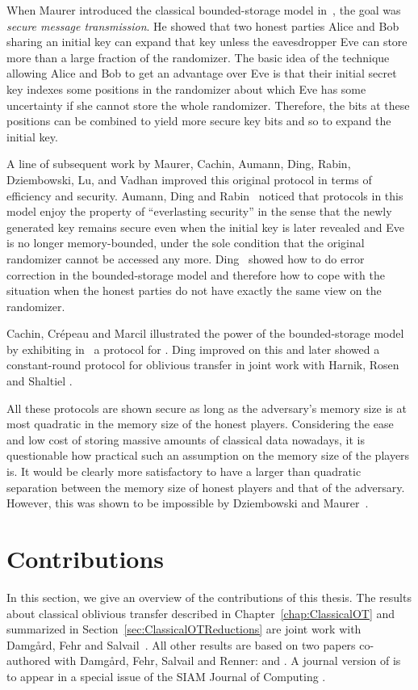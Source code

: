When Maurer introduced the classical bounded-storage model
in~\cite{Maurer90}, the goal was \emph{secure message transmission}.
He showed that two honest parties Alice and Bob sharing an initial key
can expand that key unless the eavesdropper Eve
can store more than a large fraction of the randomizer.  The basic
idea of the technique allowing Alice and Bob to get an advantage
over Eve is that their initial secret key indexes some positions in
the randomizer about which Eve has some uncertainty if she cannot
store the whole randomizer. Therefore, the bits at these positions can
be combined to yield more secure key bits and so to expand the initial
key.

A line of subsequent work by Maurer, Cachin, Aumann, Ding, Rabin,
Dziembowski, Lu, and Vadhan \cite{Maurer92, CM97, ADR02, DM04, Lu04,
  Vadhan04} improved this original protocol in terms of efficiency and
security. Aumann, Ding and Rabin~\cite{ADR02} noticed that
protocols in this model enjoy the property of ``everlasting security'' in the sense that the newly
generated key remains secure even when the initial key is later
revealed and Eve is no longer memory-bounded, under the sole condition
that the original randomizer cannot be accessed any
more. Ding~\cite{Ding05} showed how to do 
error correction in the
bounded-storage model and therefore how to cope with the situation
when the honest parties do not have exactly the same view on the
randomizer.

Cachin, Cr\'epeau and Marcil illustrated the power of the
bounded-storage model by exhibiting in~\cite{CCM98} a protocol for
\OT. Ding improved on this \cite{Ding01} and later showed a
constant-round protocol for oblivious transfer in joint work with
Harnik, Rosen and Shaltiel \cite{DHRS04}.

All these protocols are shown secure as long as the adversary's memory
size is at most quadratic in the memory size of the honest players.
Considering the ease and low cost of storing massive amounts of classical
data nowadays, it is questionable how practical such an assumption on the
memory size of the players is. It would be clearly more satisfactory
to have a larger than quadratic separation between the memory size of
honest players and that of the adversary. However, this was shown to
be impossible by Dziembowski and Maurer~\cite{DM04}.


\section{Contributions} \label{sec:contributions}
In this section, we give an overview of the contributions of this
thesis.
The results about classical oblivious transfer described in
Chapter~\ref{chap:ClassicalOT} and summarized in
Section~\ref{sec:ClassicalOTReductions} are joint
work with Damg{\aa}rd, Fehr and Salvail~\cite{DFSS06}. 
All other results are based on two papers co-authored with Damg{\aa}rd, Fehr,
Salvail and Renner: \cite{DFSS05} and \cite{DFRSS07}. A journal version of \cite{DFSS05}
is to appear in a special issue of the SIAM Journal of Computing
\cite{DFSS08journal}.


